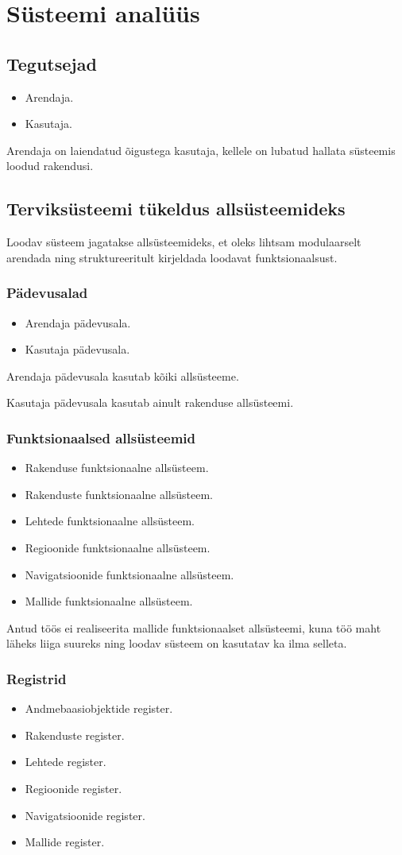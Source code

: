 \documentclass[a4paper,12pt]{article} %
\begin{document}
\section{Süsteemi analüüs}
\subsection{Tegutsejad}
\begin{itemize}
\item Arendaja.
\item Kasutaja.
\end{itemize}
Arendaja on laiendatud õigustega kasutaja, kellele on lubatud hallata süsteemis loodud rakendusi.
\subsection{Terviksüsteemi tükeldus allsüsteemideks}
Loodav süsteem jagatakse allsüsteemideks, et oleks lihtsam modulaarselt arendada ning struktureeritult kirjeldada loodavat funktsionaalsust.
\subsubsection{Pädevusalad}
\begin{itemize}
\item Arendaja pädevusala.
\item Kasutaja pädevusala.
\end{itemize}
Arendaja pädevusala kasutab kõiki allsüsteeme.\par
Kasutaja pädevusala kasutab ainult rakenduse allsüsteemi.
\subsubsection{Funktsionaalsed allsüsteemid}
\begin{itemize}
\item Rakenduse funktsionaalne allsüsteem.
\item Rakenduste funktsionaalne allsüsteem.
\item Lehtede funktsionaalne allsüsteem.
\item Regioonide funktsionaalne allsüsteem.
\item Navigatsioonide funktsionaalne allsüsteem.
\item Mallide funktsionaalne allsüsteem.
\end{itemize}
Antud töös ei realiseerita mallide funktsionaalset allsüsteemi, kuna töö maht läheks liiga suureks ning loodav süsteem on kasutatav ka ilma selleta.
\subsubsection{Registrid}
\begin{itemize}
\item Andmebaasiobjektide register.
\item Rakenduste register.
\item Lehtede register.
\item Regioonide register.
\item Navigatsioonide register.
\item Mallide register.
\end{itemize}
\end{document}
